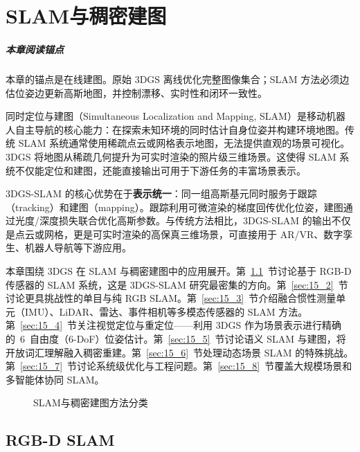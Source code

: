 \chapter{SLAM与稠密建图}
\label{ch:15}

\paragraph*{本章阅读锚点}
本章的锚点是在线建图。原始 3DGS 离线优化完整图像集合；SLAM 方法必须边估位姿边更新高斯地图，并控制漂移、实时性和闭环一致性。


同时定位与建图（Simultaneous Localization and Mapping, SLAM）是移动机器人自主导航的核心能力：在探索未知环境的同时估计自身位姿并构建环境地图。传统 SLAM 系统通常使用稀疏点云或网格表示地图，无法提供直观的场景可视化。3DGS 将地图从稀疏几何提升为可实时渲染的照片级三维场景。这使得 SLAM 系统不仅能定位和建图，还能直接输出可用于下游任务的丰富场景表示。

3DGS-SLAM 的核心优势在于\textbf{表示统一}：同一组高斯基元同时服务于跟踪（tracking）和建图（mapping）。跟踪利用可微渲染的梯度回传优化位姿，建图通过光度/深度损失联合优化高斯参数。与传统方法相比，3DGS-SLAM 的输出不仅是点云或网格，更是可实时渲染的高保真三维场景，可直接用于 AR/VR、数字孪生、机器人导航等下游应用。

本章围绕 3DGS 在 SLAM 与稠密建图中的应用展开。第~\ref{sec:15_1}~节讨论基于 RGB-D 传感器的 SLAM 系统，这是 3DGS-SLAM 研究最密集的方向。第~\ref{sec:15_2}~节讨论更具挑战性的单目与纯 RGB SLAM。第~\ref{sec:15_3}~节介绍融合惯性测量单元（IMU）、LiDAR、雷达、事件相机等多模态传感器的 SLAM 方法。第~\ref{sec:15_4}~节关注视觉定位与重定位——利用 3DGS 作为场景表示进行精确的~6~自由度（6-DoF）位姿估计。第~\ref{sec:15_5}~节讨论语义 SLAM 与建图，将开放词汇理解融入稠密重建。第~\ref{sec:15_6}~节处理动态场景 SLAM 的特殊挑战。第~\ref{sec:15_7}~节讨论系统级优化与工程问题。第~\ref{sec:15_8}~节覆盖大规模场景和多智能体协同 SLAM。

\begin{figure}[htbp]
\centering
\resizebox{\textwidth}{!}{}
\caption{SLAM与稠密建图方法分类}
\label{fig:ch15_slam_taxonomy}
\end{figure}

\section{RGB-D SLAM}
\label{sec:15_1}

